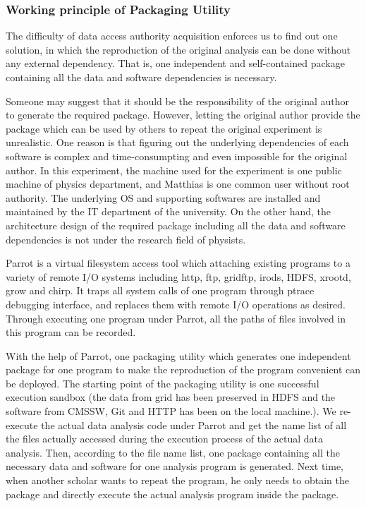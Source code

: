 \documentclass{acm_proc_article-sp}
\begin{document}
\subsubsection{Working principle of Packaging Utility} 

The difficulty of data access authority acquisition enforces us to find out one
solution, in which the reproduction of the original analysis can be done
without any external dependency. That is, one independent and self-contained
package containing all the data and software dependencies is necessary. 

Someone may suggest that it should be the responsibility of the original author
to generate the required package. However, letting the original author provide
the package which can be used by others to repeat the original experiment is
unrealistic. One reason is that figuring out the underlying dependencies of
each software is complex and time-consumpting and even impossible for the
original author. In this experiment, the machine used for the experiment is one
public machine of physics department, and Matthias is one common user without
root authority. The underlying OS and supporting softwares are installed and
maintained by the IT department of the university. On the other hand, the
architecture design of the required package including all the data and software
dependencies is not under the research field of physists.

Parrot is a virtual filesystem access tool which attaching existing programs to
a variety of remote I/O systems including http, ftp, gridftp, irods, HDFS,
xrootd, grow and chirp. It traps all system calls of one program through ptrace
debugging interface, and replaces them with remote I/O operations as desired.
Through executing one program under Parrot, all the paths of files involved in
this program can be recorded.  

With the help of Parrot, one packaging utility which generates one independent
package for one program to make the reproduction of the program convenient can
be deployed. The starting point of the packaging utility is one successful execution
sandbox (the data from grid has been preserved in HDFS and the software from
CMSSW, Git and HTTP has been on the local machine.). We re-execute the actual
data analysis code under Parrot and get the name list of all the files actually
accessed during the execution process of the actual data analysis. Then,
according to the file name list, one package containing all the necessary data
and software for one analysis program is generated. Next time, when another
scholar wants to repeat the program, he only needs to obtain the package and
directly execute the actual analysis program inside the package.
\end{document}
